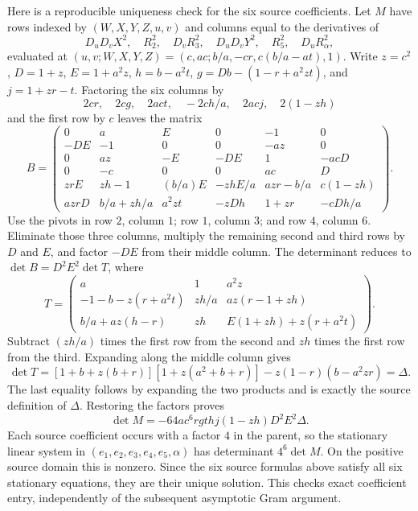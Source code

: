 \label{p61209c7390b0:sec:c2-contact-determinant}

Here is a reproducible uniqueness check for the six source coefficients.
Let $M$ have rows indexed by $(W,X,Y,Z,u,v)$ and columns equal to the
derivatives of
\[
D_uD_vX^2,\quad R_2^2,\quad D_vR_3^2,\quad
D_uD_vY^2,\quad R_5^2,\quad D_uR_\alpha^2,
\]
evaluated at $(u,v;W,X,Y,Z)=(c,ac;b/a,-cr,c(b/a-at),1)$.
Write $z=c^2$, $D=1+z$, $E=1+a^2z$, $h=b-a^2t$,
$g=Db-(1-r+a^2zt)$, and $j=1+zr-t$.
Factoring the six columns by
\[
2cr,\quad2cg,\quad2act,\quad-2ch/a,\quad2acj,
\quad2(1-zh)
\]
and the first row by $c$ leaves the matrix
\[
B=\begin{pmatrix}
0&a&E&0&-1&0\\
-DE&-1&0&0&-az&0\\
0&az&-E&-DE&1&-acD\\
0&-c&0&0&ac&D\\
zrE&zh-1&(b/a)E&-zhE/a&azr-b/a&c(1-zh)\\
azrD&b/a+zh/a&a^2zt&-zDh&1+zr&-cDh/a
\end{pmatrix}.
\]
Use the pivots in row $2$, column $1$; row $1$, column $3$; and
row $4$, column $6$.  Eliminate those three columns, multiply the
remaining second and third rows by $D$ and $E$, and factor $-DE$
from their middle column.  The determinant reduces to
$\det B=D^2E^2\det T$, where
\[
T=\begin{pmatrix}
a&1&a^2z\\
-1-b-z(r+a^2t)&zh/a&az(r-1+zh)\\
b/a+az(h-r)&zh&E(1+zh)+z(r+a^2t)
\end{pmatrix}.
\]
Subtract $(zh/a)$ times the first row from the second and $zh$ times
the first row from the third.  Expanding along the middle column gives
\[
\det T=[1+b+z(b+r)][1+z(a^2+b+r)]
-z(1-r)(b-a^2zr)=\Delta.
\]
The last equality follows by expanding the two products and is exactly
the source definition of $\Delta$.  Restoring the factors proves
\begin{equation}
\det M=-64a c^6rgt h j(1-zh)D^2E^2\Delta.
\label{p61209c7390b0:eq:c2-entry-determinant}
\end{equation}
Each source coefficient occurs with a factor $4$ in the parent, so the
stationary linear system in $(e_1,e_2,e_3,e_4,e_5,\alpha)$ has determinant
$4^6\det M$.  On the positive source domain this is nonzero.  Since the
six source formulas above satisfy all six stationary equations,
they are their unique solution.  This checks exact coefficient entry,
independently of the subsequent asymptotic Gram argument.


